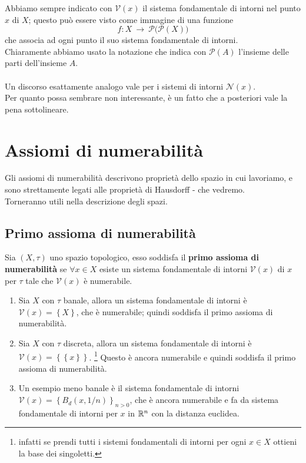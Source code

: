 \begin{remark} 
	Abbiamo sempre indicato con $\mathcal{V}(x)$ il sistema fondamentale di intorni nel punto $x$ di $X$; questo può essere visto come immagine di una funzione 
	\begin{equation*}
		f : X \ \rightarrow \ \mathcal{P}\big(\mathcal{P} (X) \big)
	\end{equation*}
	che associa ad ogni punto il suo sistema fondamentale di intorni. \\ Chiaramente abbiamo usato la notazione che indica con $\mathcal{P}(A)$ l'insieme delle parti dell'insieme $A$. \\ \\ Un discorso esattamente analogo vale per i sistemi di intorni $\mathcal{N}(x)$. \\ Per quanto possa sembrare non interessante, è un fatto che a posteriori vale la pena sottolineare.
\end{remark}


\newpage
\section{Assiomi di numerabilità}
Gli assiomi di numerabilità descrivono proprietà dello spazio in cui lavoriamo, e sono strettamente legati alle proprietà di Hausdorff - che vedremo. \\
Torneranno utili nella descrizione degli spazi.
\subsection{\textcolor{TopGener}{\textbf{Primo assioma di numerabilità}}}


\begin{definition}
	Sia $(X,\tau)$ uno spazio topologico, esso soddisfa il \textbf{primo assioma di numerabilità} se $\forall x \in X$ esiste un sistema fondamentale di intorni $\mathcal{V}(x)$ di $x$ per $\tau$ tale che $\mathcal{V}(x)$ è numerabile.
\end{definition}

\begin{example}	
\begin{enumerate}
	\item Sia $X$ con $\tau$ banale, allora un sistema fondamentale di intorni è $\mathcal{V}(x) = \left\{X\right\}$, che è numerabile; quindi soddisfa il primo assioma di numerabilità.
	\item Sia $X$ con $\tau$ discreta, allora un sistema fondamentale di intorni è $\mathcal{V}(x) = \left\{\left\{x\right\}\right\}$. 
	\footnote{infatti se prendi tutti i sistemi fondamentali di intorni per ogni $x\in X$ ottieni la base dei singoletti.} 
	Questo è ancora numerabile e quindi soddisfa il primo assioma di numerabilità.
	\item Un esempio meno banale è il sistema fondamentale di intorni $\mathcal{V}(x) = \left\{B_d(x, 1/n)\right\}_{n > 0}$, che è ancora numerabile e fa da sistema fondamentale di intorni per $x$ in $\mathbb{R}^n$ con la distanza euclidea.
\end{enumerate}
\end{example}



